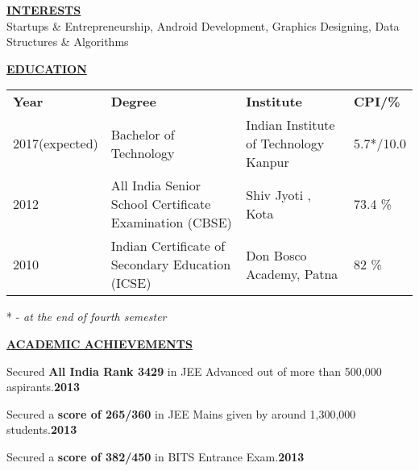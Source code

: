 \documentclass[letterpaper]{deedy-resume} %
\begin{document}
%
%
\begin{minipage}[t]{1.00\textwidth} %

{\uppercase\uline{\textbf{\large{Interests}}\hfill}\\}
\microspace
Startups \& Entrepreneurship, Android Development, Graphics Designing, Data Structures \& Algorithms
\microspace

{\uppercase\uline{\textbf{\large{Education}}\hfill}\\}

\begin{tabular}{|l|l|l|l|}
\cline{1-4}
\textbf{Year}&\textbf{Degree}&\textbf{Institute}&\textbf{CPI/\%}\\
\cline{1-4}
2017(expected)&Bachelor of Technology&Indian Institute of Technology Kanpur&5.7*/10.0\\
2012&All India Senior School Certificate Examination (CBSE)&Shiv Jyoti , Kota&73.4 \%\\
2010&Indian Certificate of Secondary Education (ICSE)&Don Bosco Academy, Patna&82 \%\\
\cline{1-4}
\end{tabular}
\microspace
\hfill{* - \textit{\small{at the end of fourth semester}}}


{\uppercase\uline{\textbf{\large{Academic  Achievements}}\hfill}}
\begin{tightitemize}
\item Secured \textbf{All India Rank 3429} in JEE Advanced out of more than 500,000 aspirants.\hfill{\textbf{2013}}
\item Secured a \textbf{score of 265/360} in JEE Mains given by around 1,300,000 students.\hfill{\textbf{2013}}
\item Secured a \textbf{score of 382/450} in BITS Entrance Exam.\hfill{\textbf{2013}}
\end{tightitemize}

\sectionspace %



\end{minipage}
\end{document}

